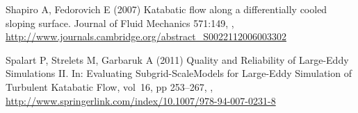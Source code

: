 \begin{thebibliography}{26}
Shapiro A, Fedorovich E (2007) {Katabatic flow along a differentially cooled
  sloping surface}. Journal of Fluid Mechanics 571:149,
  ,
  \urlprefix\url{http://www.journals.cambridge.org/abstract\_S0022112006003302}

Spalart P, Strelets M, Garbaruk A (2011) {Quality and Reliability of Large-Eddy
  Simulations II}. In: Evaluating Subgrid-ScaleModels for Large-Eddy Simulation
  of Turbulent Katabatic Flow, vol~16, pp 253--267,
  ,
  \urlprefix\url{http://www.springerlink.com/index/10.1007/978-94-007-0231-8}

\end{thebibliography}






